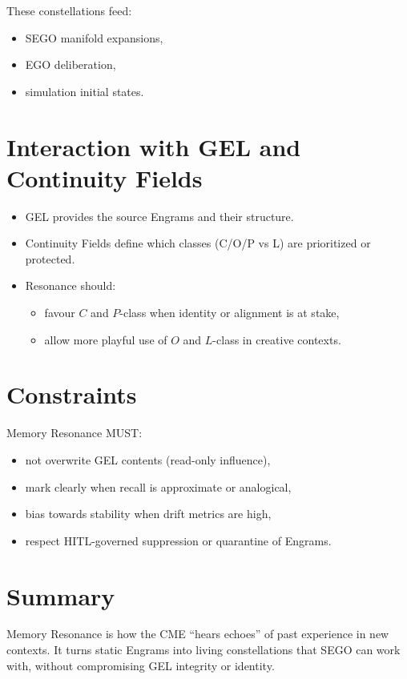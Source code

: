 These constellations feed:
\begin{itemize}
    \item SEGO manifold expansions,
    \item EGO deliberation,
    \item simulation initial states.
\end{itemize}

\section{Interaction with GEL and Continuity Fields}

\begin{itemize}
    \item GEL provides the source Engrams and their structure.
    \item Continuity Fields define which classes (C/O/P vs L) are
          prioritized or protected.
    \item Resonance should:
          \begin{itemize}
              \item favour $C$ and $P$-class when identity or alignment is at stake,
              \item allow more playful use of $O$ and $L$-class in creative contexts.
          \end{itemize}
\end{itemize}

\section{Constraints}

Memory Resonance MUST:
\begin{itemize}
    \item not overwrite GEL contents (read-only influence),
    \item mark clearly when recall is approximate or analogical,
    \item bias towards stability when drift metrics are high,
    \item respect HITL-governed suppression or quarantine of Engrams.
\end{itemize}

\section{Summary}

Memory Resonance is how the CME ``hears echoes'' of past experience in
new contexts. It turns static Engrams into living constellations that
SEGO can work with, without compromising GEL integrity or identity.
